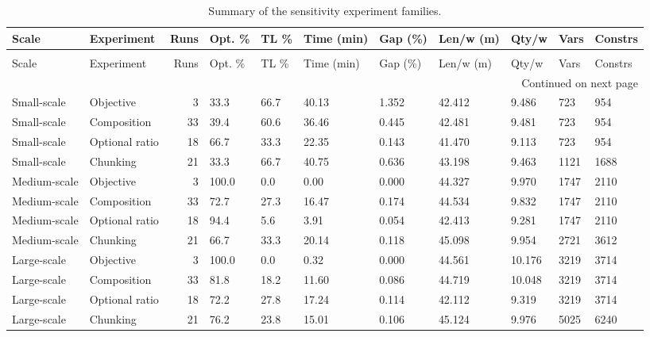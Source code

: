 \begin{longtable}{llrllllllll}
\caption{Summary of the sensitivity experiment families.} \label{tab:app_sensitivity_overview} \\
\toprule
Scale & Experiment & Runs & Opt. \% & TL \% & Time (min) & Gap (\%) & Len/w (m) & Qty/w & Vars & Constrs \\
\midrule
\endfirsthead
\caption[]{Summary of the sensitivity experiment families.} \\
\toprule
Scale & Experiment & Runs & Opt. \% & TL \% & Time (min) & Gap (\%) & Len/w (m) & Qty/w & Vars & Constrs \\
\midrule
\endhead
\midrule
\multicolumn{11}{r}{Continued on next page} \\
\midrule
\endfoot
\bottomrule
\endlastfoot
Small-scale & Objective & 3 & 33.3 & 66.7 & 40.13 & 1.352 & 42.412 & 9.486 & 723 & 954 \\
Small-scale & Composition & 33 & 39.4 & 60.6 & 36.46 & 0.445 & 42.481 & 9.481 & 723 & 954 \\
Small-scale & Optional ratio & 18 & 66.7 & 33.3 & 22.35 & 0.143 & 41.470 & 9.113 & 723 & 954 \\
Small-scale & Chunking & 21 & 33.3 & 66.7 & 40.75 & 0.636 & 43.198 & 9.463 & 1121 & 1688 \\
Medium-scale & Objective & 3 & 100.0 & 0.0 & 0.00 & 0.000 & 44.327 & 9.970 & 1747 & 2110 \\
Medium-scale & Composition & 33 & 72.7 & 27.3 & 16.47 & 0.174 & 44.534 & 9.832 & 1747 & 2110 \\
Medium-scale & Optional ratio & 18 & 94.4 & 5.6 & 3.91 & 0.054 & 42.413 & 9.281 & 1747 & 2110 \\
Medium-scale & Chunking & 21 & 66.7 & 33.3 & 20.14 & 0.118 & 45.098 & 9.954 & 2721 & 3612 \\
Large-scale & Objective & 3 & 100.0 & 0.0 & 0.32 & 0.000 & 44.561 & 10.176 & 3219 & 3714 \\
Large-scale & Composition & 33 & 81.8 & 18.2 & 11.60 & 0.086 & 44.719 & 10.048 & 3219 & 3714 \\
Large-scale & Optional ratio & 18 & 72.2 & 27.8 & 17.24 & 0.114 & 42.112 & 9.319 & 3219 & 3714 \\
Large-scale & Chunking & 21 & 76.2 & 23.8 & 15.01 & 0.106 & 45.124 & 9.976 & 5025 & 6240 \\
\end{longtable}
